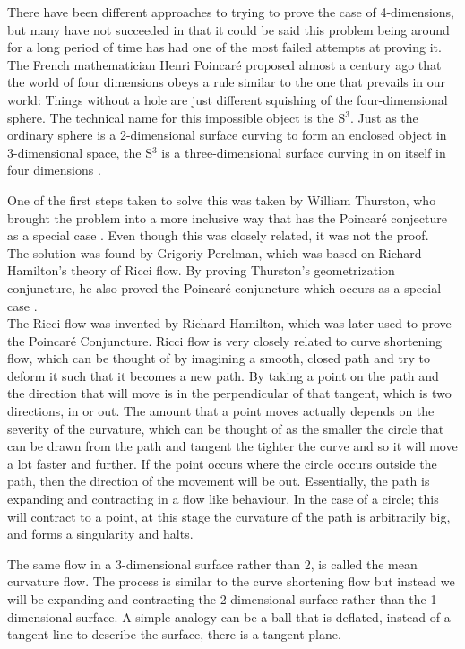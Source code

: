 \documentclass[12pt]{article} %
\begin{document}
\begin{flushleft}
There have been different approaches to trying to prove the case of 4-dimensions, but many have not succeeded in that it could be said this problem being around for a long period of time has had one of the most failed attempts at proving it. \\

The French mathematician Henri Poincar\'e proposed almost a century ago \cite{johnson:ds} that the world of four dimensions obeys a rule similar to the one that prevails in our world: Things without a hole are just different squishing of the four-dimensional sphere. The technical name for this impossible object is the S$^{3}$. Just as the ordinary sphere is a 2-dimensional surface curving to form an enclosed object in 3-dimensional space, the S$^{3}$ is a three-dimensional surface curving in on itself in four dimensions \cite{johnson:ds}.

One of the first steps taken to solve this was taken by William Thurston, who brought the problem into a more inclusive way that has the Poincar\'e conjecture as a special case \cite{Weisstein:tg}. Even though this was closely related, it was not the proof.\\
The solution was found by Grigoriy Perelman, which was based on Richard Hamilton's theory of Ricci flow. By proving Thurston's geometrization conjuncture, he also proved the Poincar\'e conjuncture which occurs as a special case \cite{clay:pc}.\\

The Ricci flow was invented by Richard Hamilton, which was later used to prove the Poincar\'e Conjuncture. Ricci flow is very closely related to curve shortening flow, which can be thought of by imagining a smooth, closed path and try to deform it such that it becomes a new path. By taking a point on the path and the direction that will move is in the perpendicular of that tangent, which is two directions, in or out. The amount that a point moves actually depends on the severity of the curvature, which can be thought of as the smaller the circle that can be drawn from the path and tangent the tighter the curve and so it will move a lot faster and further. If the point occurs where the circle occurs outside the path, then the direction of the movement will be out. Essentially, the path is expanding and contracting in a flow like behaviour. In the case of a circle; this will contract to a point, at this stage the curvature of the path is arbitrarily big, and forms a singularity and halts.

The same flow in a 3-dimensional surface rather than 2, is called the mean curvature flow. The process is similar to the curve shortening flow but instead we will be expanding and contracting the 2-dimensional surface rather than the 1-dimensional surface. A simple analogy can be a ball that is deflated, instead of a tangent line to describe the surface, there is a tangent plane.\\


\end{flushleft}
\end{document}
